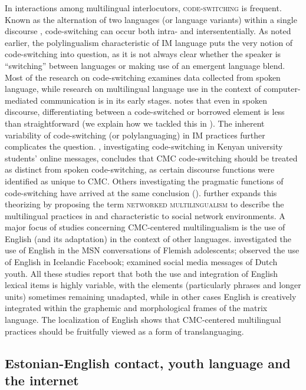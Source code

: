 \documentclass[output=paper]{langscibook}
\begin{document}
In interactions among multilingual interlocutors, \textsc{code-switching} is frequent. Known as the alternation of two languages (or language variants) within a single discourse \citep{Poplack1980}, code-switching can occur both intra- and intersententially. As noted earlier, the polylingualism characteristic of IM language puts the very notion of code-switching into question, as it is not always clear whether the speaker is “switching” between languages or making use of an emergent language blend. Most of the research on code-switching examines data collected from spoken language, while research on multilingual language use in the context of computer-mediated communication is in its early stages. \citet{Deuchar2020} notes that even in spoken discourse, differentiating between a code-switched or borrowed element is less than straightforward (we explain how we tackled this in ). The inherent variability of code-switching (or polylanguaging) in IM practices further complicates the question. \citet{Barasa2016}, investigating code-switching in Kenyan university students’ online messages, concludes that CMC code-switching should be treated as distinct from spoken code-switching, as certain discourse functions were identified as unique to CMC. Others investigating the pragmatic functions of code-switching have arrived at the same conclusion (\citealt{Hinrichs2006, Herring2013}). \citet{Androutsopoulos2015} further expands this theorizing by proposing the term \textsc{networked} \textsc{multilingualism} to describe the multilingual practices in and characteristic to social network environments. A major focus of studies concerning CMC-centered multilingualism is the use of English (and its adaptation) in the context of other languages.   investigated the use of English in the MSN conversations of Flemish adolescents; \citet{Isenmann2022} observed the use of English in Icelandic Facebook;  \citet{VerheijenVanHout2022} examined social media messages of Dutch youth. All these studies report that both the use and integration of English lexical items is highly variable, with the elements (particularly phrases and longer units) sometimes remaining unadapted, while in other cases English is creatively integrated within the graphemic and morphological frames of the matrix language. The localization of English shows that CMC-centered multilingual practices should be fruitfully viewed as a form of translanguaging.

\subsection{Estonian-English contact, youth language and the internet}
\end{document}
